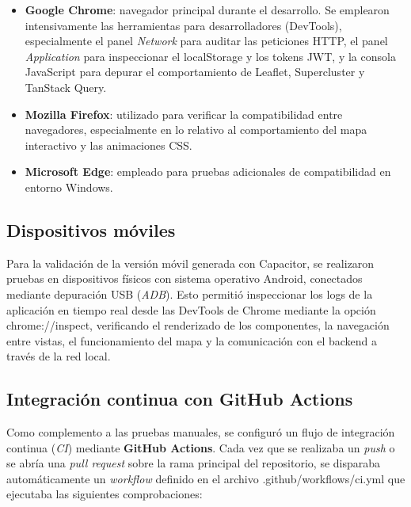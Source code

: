 \begin{itemize}
    \item \textbf{Google Chrome}: navegador principal durante el desarrollo. Se emplearon intensivamente las herramientas para desarrolladores (DevTools), especialmente el panel \emph{Network} para auditar las peticiones HTTP, el panel \emph{Application} para inspeccionar el localStorage y los tokens JWT, y la consola JavaScript para depurar el comportamiento de Leaflet, Supercluster y TanStack Query.
    \item \textbf{Mozilla Firefox}: utilizado para verificar la compatibilidad entre navegadores, especialmente en lo relativo al comportamiento del mapa interactivo y las animaciones CSS.
    \item \textbf{Microsoft Edge}: empleado para pruebas adicionales de compatibilidad en entorno Windows.
\end{itemize}

\subsection{Dispositivos móviles}

Para la validación de la versión móvil generada con Capacitor, se realizaron pruebas en dispositivos físicos con sistema operativo Android, conectados mediante depuración USB (\emph{ADB}). Esto permitió inspeccionar los logs de la aplicación en tiempo real desde las DevTools de Chrome mediante la opción chrome://inspect, verificando el renderizado de los componentes, la navegación entre vistas, el funcionamiento del mapa y la comunicación con el backend a través de la red local.

\subsection{Integración continua con GitHub Actions}

Como complemento a las pruebas manuales, se configuró un flujo de integración continua (\emph{CI}) mediante \textbf{GitHub Actions}. Cada vez que se realizaba un \emph{push} o se abría una \emph{pull request} sobre la rama principal del repositorio, se disparaba automáticamente un \emph{workflow} definido en el archivo .github/workflows/ci.yml que ejecutaba las siguientes comprobaciones:

